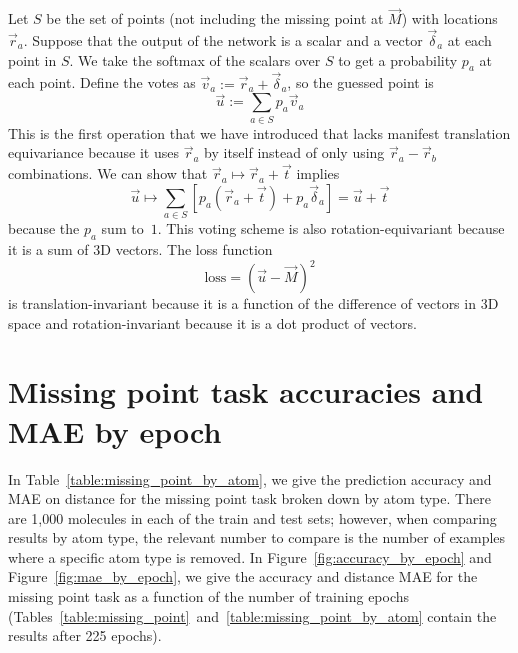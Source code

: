 \documentclass{article}
\begin{document}
Let $S$ be the set of points (not including the missing point at $\vec{M}$) with locations $\vec{r}_a$.  Suppose that the output of the network is a scalar and a vector $\vec{\delta}_a$ at each point in $S$.  We take the softmax of the scalars over $S$ to get a probability $p_a$ at each point.  Define the votes as $\vec{v}_a := \vec{r}_a + \vec{\delta}_a$, so the guessed point is \[\vec{u} := \sum_{a\in S} p_a \vec{v}_a\]  This is the first operation that we have introduced that lacks manifest translation equivariance because it uses $\vec{r}_a$ by itself instead of only using $\vec{r}_{a} - \vec{r}_b$ combinations.  We can show that $\vec{r}_a \mapsto \vec{r}_a + \vec{t}$ implies 
\[\vec{u} \mapsto \sum_{a\in S} \left[p_a (\vec{r}_a + \vec{t}) + p_a \vec{\delta}_a\right] = \vec{u} + \vec{t}\] 
because the $p_a$ sum to~$1$.  This voting scheme is also rotation-equivariant because it is a sum of 3D vectors.  The loss function \[\text{loss} = (\vec{u} - \vec{M})^2\] is translation-invariant because it is a function of the difference of vectors in 3D space and rotation-invariant because it is a dot product of vectors.

\section{Missing point task accuracies and MAE by epoch}

In Table~\ref{table:missing_point_by_atom}, we give the prediction accuracy and MAE on distance for the missing point task broken down by atom type. There are 1,000 molecules in each of the train and test sets; however, when comparing results by atom type, the relevant number to compare is the number of examples where a specific atom type is removed. In Figure~\ref{fig:accuracy_by_epoch} and Figure~\ref{fig:mae_by_epoch}, we give the accuracy and distance MAE for the missing point task as a function of the number of training epochs (Tables~\ref{table:missing_point}~and~\ref{table:missing_point_by_atom} contain the results after 225 epochs). 
\end{document}
